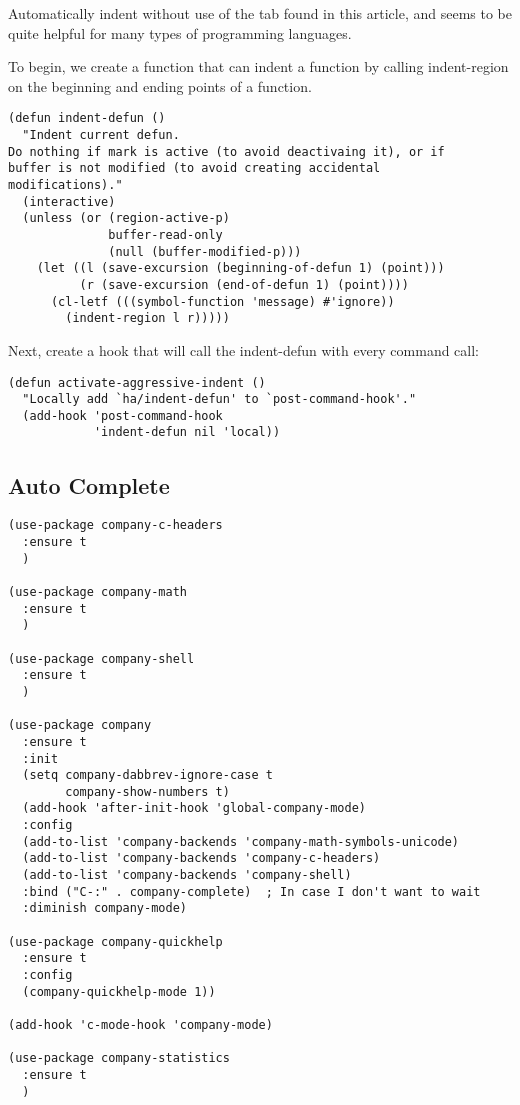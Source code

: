 \documentclass[12pt]{article}
\begin{document}
Automatically indent without use of the tab found in this article, and seems to be quite helpful for many types of programming languages.

To begin, we create a function that can indent a function by calling indent-region on the beginning and ending points of a function.
\lstset{language=Lisp,label= ,caption= ,captionpos=b,numbers=none}
\begin{lstlisting}
(defun indent-defun ()
  "Indent current defun.
Do nothing if mark is active (to avoid deactivaing it), or if
buffer is not modified (to avoid creating accidental
modifications)."
  (interactive)
  (unless (or (region-active-p)
              buffer-read-only
              (null (buffer-modified-p)))
    (let ((l (save-excursion (beginning-of-defun 1) (point)))
          (r (save-excursion (end-of-defun 1) (point))))
      (cl-letf (((symbol-function 'message) #'ignore))
        (indent-region l r)))))
\end{lstlisting}

Next, create a hook that will call the indent-defun with every command call:

\lstset{language=Lisp,label= ,caption= ,captionpos=b,numbers=none}
\begin{lstlisting}
(defun activate-aggressive-indent ()
  "Locally add `ha/indent-defun' to `post-command-hook'."
  (add-hook 'post-command-hook
            'indent-defun nil 'local))
\end{lstlisting}

\subsection{Auto Complete}
\label{sec:org70fcd60}
\lstset{language=Lisp,label= ,caption= ,captionpos=b,numbers=none}
\begin{lstlisting}
(use-package company-c-headers
  :ensure t
  )

(use-package company-math 
  :ensure t
  )

(use-package company-shell 
  :ensure t
  )

(use-package company
  :ensure t
  :init
  (setq company-dabbrev-ignore-case t
        company-show-numbers t)
  (add-hook 'after-init-hook 'global-company-mode)
  :config
  (add-to-list 'company-backends 'company-math-symbols-unicode)
  (add-to-list 'company-backends 'company-c-headers)
  (add-to-list 'company-backends 'company-shell)
  :bind ("C-:" . company-complete)  ; In case I don't want to wait
  :diminish company-mode)

(use-package company-quickhelp
  :ensure t
  :config
  (company-quickhelp-mode 1))

(add-hook 'c-mode-hook 'company-mode)

(use-package company-statistics
  :ensure t 
  )

\end{lstlisting}
\end{document}
